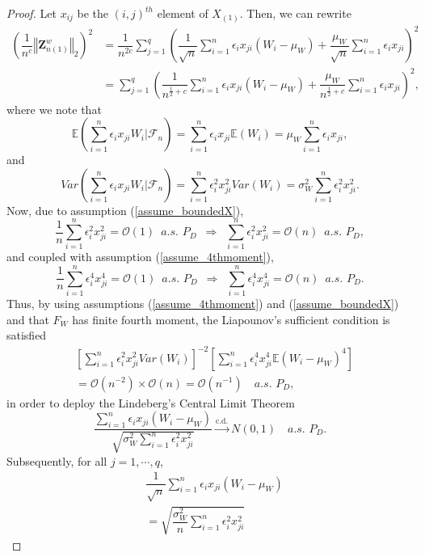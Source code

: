 \documentclass[ejs,authoryear,linksfromyear]{imsart}
\newcommand{\sumin}{\sum_{i=1}^n} %
\newcommand{\CONV}[1]{\stackrel{\text{#1}}{\longrightarrow}} %
\newcommand{\znwa}{\bm{Z}_{n(1)}^w}
\numberwithin{equation}{section}
\theoremstyle{plain}
\begin{document}
\begin{proof}
	Let $x_{ij}$ be the $(i,j)^{th}$ element of $X_{(1)}$. Then, we can rewrite
	\begin{align*}
	\left(
		\dfrac{1}{n^c}
		\left\Vert 
			\znwa
		\right\Vert_2
	\right)^2
	&= \dfrac{1}{n^{2c}}
	\sum_{j=1}^q 
	\left(
		\dfrac{1}{\sqrt{n}} \sumin \epsilon_i x_{ji} (W_i - \mu_W) 
		+ \dfrac{\mu_W}{\sqrt{n}} \sumin \epsilon_i x_{ji} 
	\right)^2 \\
	&= \sum_{j=1}^q 
	\left(
		\dfrac{1}{n^{\frac{1}{2}+c}} \sumin \epsilon_i x_{ji} (W_i - \mu_W) 
		+ \dfrac{\mu_W}{n^{\frac{1}{2}+c}} \sumin \epsilon_i x_{ji} 
	\right)^2,
	\end{align*}
	where we note that
	$$
	\mathbb{E}
	\left(
		\sumin \epsilon_i x_{ji} W_i  
	\bigg| \mathcal{F}_n
	\right)
	= \sumin \epsilon_i x_{ji} \mathbb{E} (W_i)
	= \mu_W \sumin \epsilon_i x_{ji}, 
	$$
	and
	$$
	Var
	\left(
		\sumin \epsilon_i x_{ji} W_i 
		\bigg| \mathcal{F}_n
	\right)
	= \sumin \epsilon_i^2 x_{ji}^2 Var(W_i) 
	= \sigma^2_W \sumin \epsilon_i^2 x_{ji}^2 .
	$$
	Now, due to assumption (\ref{assume_boundedX}), 
	$$
	\dfrac{1}{n} \sumin \epsilon_i^2 x_{ji}^2 
	= \mathcal{O}(1) \,\,\, a.s. \,\, P_D 
	\,\,\, \Longrightarrow \,\,\,
	\sumin \epsilon_i^2 x_{ji}^2 
	= \mathcal{O}(n) \,\,\, a.s. \,\, P_D,
	$$
	and coupled with assumption (\ref{assume_4thmoment}),
	$$
	\dfrac{1}{n} \sumin \epsilon_i^4 x_{ji}^4 
	= \mathcal{O}(1) \,\,\, a.s. \,\, P_D 
	\,\,\, \Longrightarrow \,\,\,
	\sumin \epsilon_i^4 x_{ji}^4 
	= \mathcal{O}(n) \,\,\, a.s. \,\, P_D.
	$$
	Thus, by using assumptions (\ref{assume_4thmoment}) and (\ref{assume_boundedX}) and that $F_W$ has finite fourth moment, the Liapounov's sufficient condition is satisfied
	\begin{align*}
	&\left[ 
		\sumin \epsilon_i^2 x_{ji}^2 Var(W_i) 
	\right]^{-2}
	\left[
		\sumin \epsilon_i^4 x_{ji}^4
		\mathbb{E} (W_i - \mu_W)^4
	\right] \\
	&= \mathcal{O} \left( n^{-2} \right) 
	\times
	\mathcal{O} \left( n \right) 
	= \mathcal{O} \left( n^{-1} \right)
	\quad a.s. \,\, P_D, 
	\end{align*}
	in order to deploy the Lindeberg's Central Limit Theorem
	$$
	\dfrac{ \sumin \epsilon_i x_{ji} (W_i - \mu_W) }
	{ \sqrt{ \sigma_W^2 \sumin \epsilon_i^2 x_{ji}^2 } }
	\CONV{c.d.} N(0,1) \quad a.s. \,\, P_D. 
	$$
	Subsequently, for all $j = 1, \cdots, q$, 
	\begin{align*}
	&\dfrac{1}{\sqrt{n}} \sumin \epsilon_i x_{ji} (W_i - \mu_W) \\
	&= \sqrt{\dfrac{\sigma^2_W}{n} \sumin \epsilon_i^2 x_{ji}^2} 

\end{align*}
\end{proof}
\end{document}

